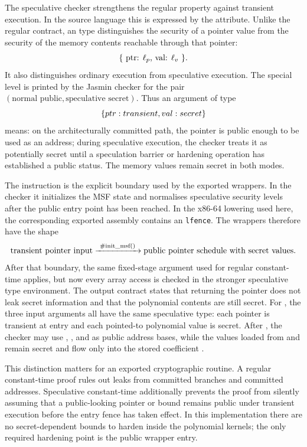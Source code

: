 The speculative checker strengthens the regular property against transient
execution.  In the source language this is expressed by the 
attribute.  Unlike the regular  contract, an  type
distinguishes the security of a pointer value from the security of the memory
contents reachable through that pointer:
\[
  \text{\{ ptr: }\ell_p\text{, val: }\ell_v
  \text{ \}}.
\]
It also distinguishes ordinary execution from speculative execution.  The
special level  is printed by the Jasmin checker for the pair
\((\text{normal public},\text{speculative secret})\).  Thus an argument of type
\[
  \{ ptr: transient, val: secret \}
\]
means: on the architecturally committed path, the pointer is public enough to
be used as an address; during speculative execution, the checker treats it as
potentially secret until a speculation barrier or hardening operation has
established a public status.  The memory values remain secret in both modes.

The instruction  is the explicit boundary used by the
exported wrappers.  In the checker it initializes the \jasmin{} MSF state and
normalises speculative security levels after the public entry point has been
reached.  In the x86-64 lowering used here, the corresponding exported
assembly contains an \texttt{lfence}.  The wrappers therefore have the shape
\[
  \text{transient pointer input}
  \xrightarrow{\ \text{\#init\_msf()}\ }
  \text{public pointer schedule with secret values}.
\]
After that boundary, the same fixed-stage argument used for regular
constant-time applies, but now every array access is checked in the stronger
speculative type environment.  The output contract
 states that returning the pointer does
not leak secret information and that the polynomial contents are still secret.
For , the three input arguments all have the
same speculative type: each pointer is transient at entry and each pointed-to
polynomial value is secret.  After , the checker may use
, , and  as public address bases, while the values
loaded from  and  remain secret and flow only into the
stored coefficient .

This distinction matters for an exported cryptographic routine.  A regular
constant-time proof rules out leaks from committed branches and committed
addresses.  Speculative constant-time additionally prevents the proof from
silently assuming that a public-looking pointer or bound remains public under
transient execution before the entry fence has taken effect.  In this
implementation there are no secret-dependent bounds to harden inside the
polynomial kernels; the only required hardening point is the public wrapper
entry.

